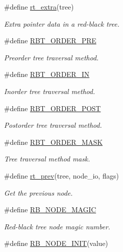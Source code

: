 \begin{CompactItemize}
\#define \hyperlink{group__dbprim__rbtree_ga23}{rt\_\-extra}(tree)
\begin{CompactList}\small\item\em Extra pointer data in a red-black tree. \item\end{CompactList}\item 
\#define \hyperlink{group__dbprim__rbtree_ga24}{RBT\_\-ORDER\_\-PRE}
\begin{CompactList}\small\item\em Preorder tree traversal method. \item\end{CompactList}\item 
\#define \hyperlink{group__dbprim__rbtree_ga25}{RBT\_\-ORDER\_\-IN}
\begin{CompactList}\small\item\em Inorder tree traversal method. \item\end{CompactList}\item 
\#define \hyperlink{group__dbprim__rbtree_ga26}{RBT\_\-ORDER\_\-POST}
\begin{CompactList}\small\item\em Postorder tree traversal method. \item\end{CompactList}\item 
\#define \hyperlink{group__dbprim__rbtree_ga27}{RBT\_\-ORDER\_\-MASK}
\begin{CompactList}\small\item\em Tree traversal method mask. \item\end{CompactList}\item 
\#define \hyperlink{group__dbprim__rbtree_ga28}{rt\_\-prev}(tree, node\_\-io, flags)
\begin{CompactList}\small\item\em Get the previous node. \item\end{CompactList}\item 
\#define \hyperlink{group__dbprim__rbtree_ga29}{RB\_\-NODE\_\-MAGIC}
\begin{CompactList}\small\item\em Red-black tree node magic number. \item\end{CompactList}\item 
\#define \hyperlink{group__dbprim__rbtree_ga30}{RB\_\-NODE\_\-INIT}(value)

\end{CompactItemize}
